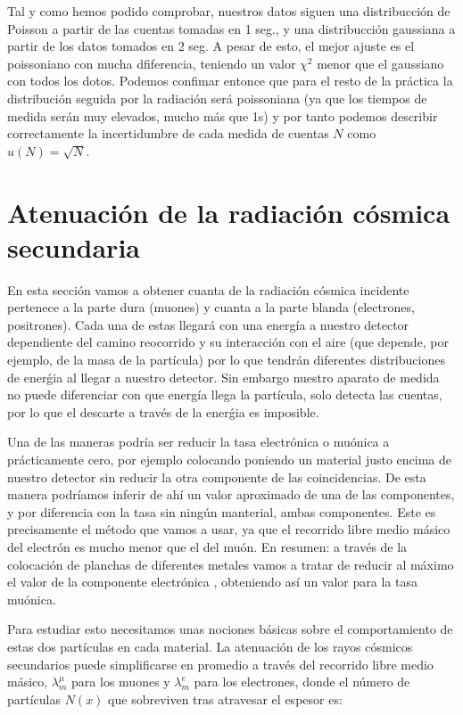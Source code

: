 \documentclass[11pt]{article}
\begin{document}
Tal y como hemos podido comprobar, nuestros datos siguen una distribucción de Poisson a partir de las cuentas tomadas en 1 seg., y una distribucción gaussiana a partir de los datos tomados en 2 seg. A pesar de esto, el mejor ajuste es el poissoniano con mucha dfiferencia, teniendo un valor $\chi^2$ menor que el gaussiano con todos los dotos. Podemos confimar entonce que para el resto de la práctica la distribución seguida por la radiación será poissoniana (ya que los tiempos de medida serán muy elevados, mucho más que 1s) y por tanto podemos describir correctamente la incertidumbre de cada medida de cuentas $N$ como $u(N)=\sqrt{N}$. 

\section{Atenuación de la radiación cósmica secundaria}

En esta sección vamos a obtener cuanta de la radiación cósmica incidente pertenece a la parte dura (muones) y cuanta a la parte blanda (electrones, positrones). Cada una de estas llegará con una energía a nuestro detector dependiente del camino reocorrido y su interacción con el aire (que depende, por ejemplo, de la masa de la partícula) por lo que tendrán diferentes distribuciones de enerǵia al llegar a nuestro detector. Sin embargo nuestro aparato de medida no puede diferenciar con que energía llega la partícula, solo detecta las cuentas, por lo que el descarte a través de la enerǵia es imposible. 

Una de las maneras podría ser reducir la tasa electrónica o muónica a prácticamente cero, por ejemplo colocando poniendo un material justo encima de nuestro detector sin reducir la otra componente de las coincidencias. De esta manera podríamos inferir de ahí un valor aproximado de una de las componentes, y por diferencia con la tasa sin ningún manterial, ambas componentes. Este es precisamente el método que vamos a usar, ya que el recorrido libre medio másico del electrón es mucho menor que el del muón. En resumen: a través de la colocación de planchas de diferentes metales vamos a tratar de reducir al máximo el valor de la componente electrónica , obteniendo así un valor para la tasa muónica. 

Para estudiar esto necesitamos unas nociones básicas sobre el comportamiento de estas dos partículas en cada material. La atenuación de los rayos cósmicos secundarios puede simplificarse en promedio a través del recorrido libre medio másico, $\lambda_ m^{\mu}$ para los muones y $\lambda_m^e$ para los electrones, donde el número de partículas $N(x)$ que sobreviven tras atravesar el espesor es: 
\end{document}
